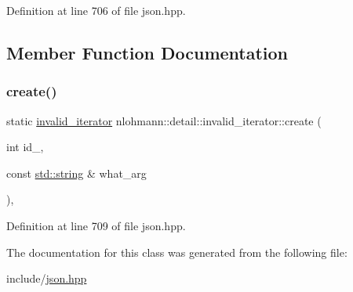 Definition at line 706 of file json.\+hpp.



\subsection{Member Function Documentation}
\mbox{\label{classnlohmann_1_1detail_1_1invalid__iterator_a4e849260a3caa1b288c7e619130c6c09}} 
\subsubsection{\texorpdfstring{create()}{create()}}
{\footnotesize\ttfamily static \hyperlink{classnlohmann_1_1detail_1_1invalid__iterator}{invalid\+\_\+iterator} nlohmann\+::detail\+::invalid\+\_\+iterator\+::create (\begin{DoxyParamCaption}\item[{int}]{id\+\_\+,  }\item[{const \hyperlink{namespacenlohmann_1_1detail_a1ed8fc6239da25abcaf681d30ace4985ab45cffe084dd3d20d928bee85e7b0f21}{std\+::string} \&}]{what\+\_\+arg }\end{DoxyParamCaption})\hspace{0.3cm}{\ttfamily [inline]}, {\ttfamily [static]}}



Definition at line 709 of file json.\+hpp.



The documentation for this class was generated from the following file\+:\begin{DoxyCompactItemize}
\item 
include/\hyperlink{json_8hpp}{json.\+hpp}\end{DoxyCompactItemize}
